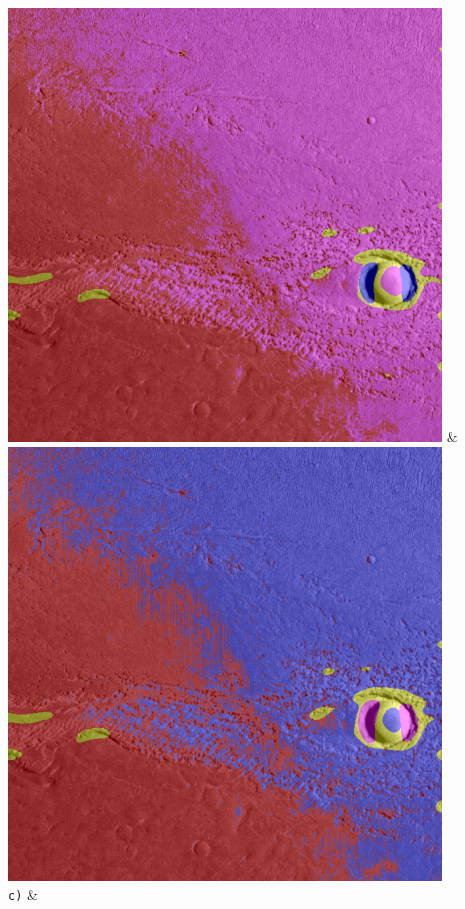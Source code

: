 \begin{table}[h!]
\begin{tabularx}{\textwidth}
		\includegraphics[width=0.9\linewidth]{images/gen/filter_size/p03_02.png_1.25.png} &
		\includegraphics[width=0.9\linewidth]{images/gen/filter_size/p03_02.png_1.50.png} \\
		\texttt{c)} &

\end{tabularx}
\end{table}
